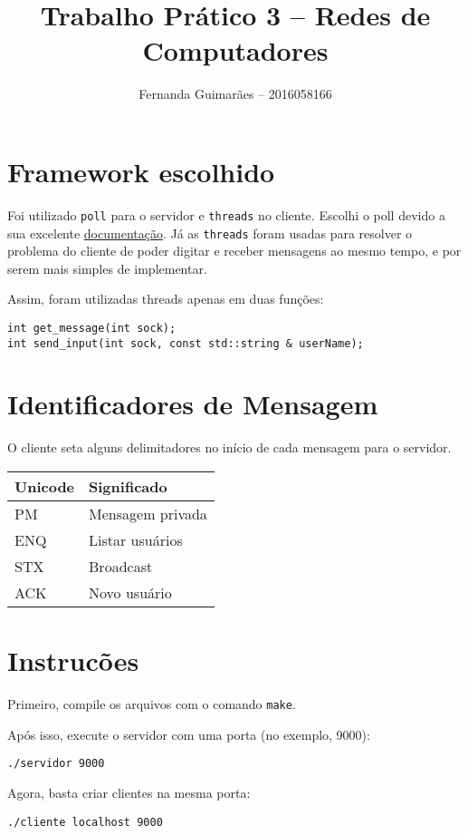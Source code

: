 \documentclass[11pt]{article}
\author{Fernanda Guimarães -- 2016058166}
\date{}
\title{Trabalho Prático 3 -- Redes de Computadores}
\begin{document}
\maketitle

\section{Framework escolhido}
\label{sec:orgf5b5ad2}
Foi utilizado \texttt{poll} para o servidor e \texttt{threads} no cliente. Escolhi o poll devido a
sua excelente \href{http://man7.org/linux/man-pages/man2/poll.2.html}{documentação}. Já as \texttt{threads} foram usadas para resolver o problema do
cliente de poder digitar e receber mensagens ao mesmo tempo, e por serem mais simples de
implementar.

Assim, foram utilizadas threads apenas em duas funções:
\begin{verbatim}
int get_message(int sock);
int send_input(int sock, const std::string & userName);
\end{verbatim}

\section{Identificadores de Mensagem}
\label{sec:org709e75c}
O cliente seta alguns delimitadores no início de cada mensagem para o servidor.

\begin{center}
\begin{tabular}{ll}
Unicode & Significado\\
\hline
PM & Mensagem privada\\
ENQ & Listar usuários\\
STX & Broadcast\\
ACK & Novo usuário\\
\end{tabular}
\end{center}

\section{Instrucões}
\label{sec:org2ec396c}
Primeiro, compile os arquivos com o comando \texttt{make}.

Após isso, execute o servidor com uma porta (no exemplo, 9000):
\begin{verbatim}
./servidor 9000
\end{verbatim}

Agora, basta criar clientes na mesma porta:
\begin{verbatim}
./cliente localhost 9000
\end{verbatim}
\end{document}
